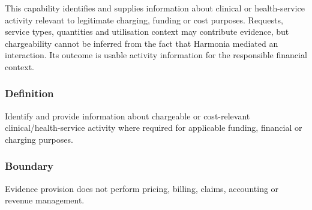 This capability identifies and supplies information about clinical or health-service activity relevant to legitimate charging, funding or cost purposes. Requests, service types, quantities and utilisation context may contribute evidence, but chargeability cannot be inferred from the fact that Harmonia mediated an interaction. Its outcome is usable activity information for the responsible financial context.

\subsubsection*{Definition}

Identify and provide information about chargeable or cost-relevant clinical/\allowbreak{}health-service activity where required for applicable funding, financial or charging purposes.

\subsubsection*{Boundary}

Evidence provision does not perform pricing, billing, claims, accounting or revenue management.

